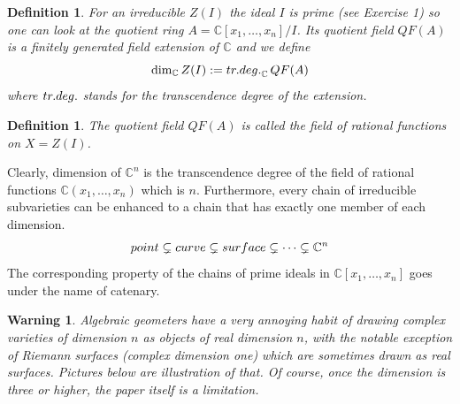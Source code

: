 \documentclass[11pt]{article}
\numberwithin{equation}{section}
\numberwithin{footnote}{section}
\newtheorem{defn}[thm]{Definition}
\newtheorem{war}[thm]{Warning}
\newcommand{\blue}{\color{blue}}
\newcommand{\C}{{\mathbb C}}
\begin{document}
\smallskip
\begin{defn} For an irreducible $Z(I)$ the ideal $I$ is prime (see Exercise 1) so one can look at the quotient ring $A=\C[x_1,\ldots,x_n]/I$. Its quotient field $QF(A)$ is a finitely generated field extension of $\C$ and we define 
$$
\dim_\C Z(I) := {\rm tr.deg.}_\C \,QF(A)
$$
where ${\rm tr.deg.}$ stands for the transcendence degree of the extension.
\end{defn}

\smallskip
\begin{defn}\label{rationalfunctions}
The quotient field $QF(A)$ is called the field of {\blue rational functions on $X=Z(I)$}.
\end{defn}

Clearly, dimension of $\C^n$ is the transcendence degree of the field of rational functions $\C(x_1,\ldots,x_n)$ which is $n$. Furthermore, every chain
of irreducible subvarieties can be enhanced to a chain that has exactly one member of each dimension.
$$
{\rm point} \subsetneq {\rm curve} \subsetneq {\rm surface } \subsetneq \cdots  \subsetneq \C^n
$$
The corresponding property of the chains of prime ideals in $\C[x_1,\ldots, x_n]$ goes under the name of {\blue catenary}.

\smallskip
\begin{war}
Algebraic geometers have a very annoying habit of drawing complex varieties of dimension $n$ as objects of {\blue real} dimension $n$, with the notable exception of Riemann surfaces (complex dimension one) which are sometimes drawn as real surfaces. Pictures below are illustration of that.
Of course, once the dimension is three or higher, the paper itself is a limitation.
\end{war}


\end{document}
